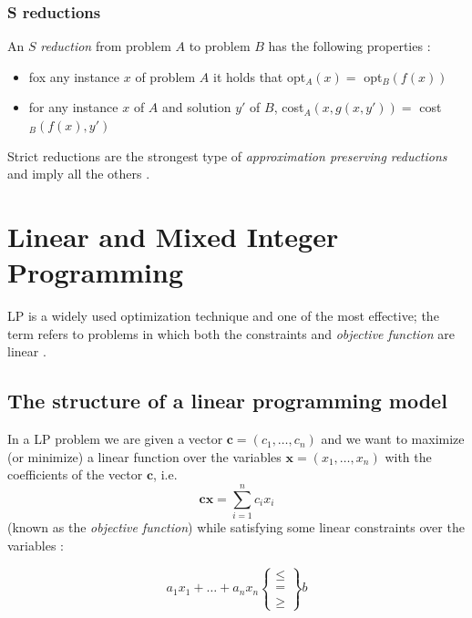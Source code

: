 \subsubsection{S reductions}%
\label{sub:strict_reductions}

An $S$ \emph{reduction} from problem $A$ to problem $B$ has the following properties \cite{Crescenzi1997ASG}:
\begin{itemize}
	\item fox any instance $x$ of problem $A$ it holds that opt$_{A} (x) = $ opt$_{B} (f(x))$
	\item for any instance $x$ of $A$ and solution $y'$ of $B$, cost$_{A} (x,
		      g(x, y')) = $ cost$_{B} (f(x), y')$
\end{itemize}

Strict reductions are the strongest type of \emph{approximation preserving
	reductions} and imply all the others \cite{Crescenzi1997ASG}.

\clearpage

\section{Linear and Mixed Integer Programming}%
\label{sec:linear_and_mixed_integer_programming}

\acrlong{LP} is a widely used optimization technique and one of the most
effective; the term refers to problems in which both the constraints and \emph{objective
	function} are linear
\cite{Edgar2001}\cite{Vanderbei2008}\cite{Dantzig1998}\cite{Martin1998}.

\subsection{The structure of a linear programming model}%
\label{sub:the_structure_of_a_linear_programming_model}

In a \acrfull{LP} problem we are given a vector $ \mathbf{c} = (c_1,
	\dots, c_n) $ and we want to maximize (or minimize) a linear function over
the variables $ \mathbf{x} = (x_1, \dots, x_n) $ with the coefficients of the
vector $ \mathbf{c} $, i.e.
\begin{equation*}
	\mathbf{cx} = \sum^{n}_{i=1} c_i x_i
\end{equation*}
(known as the \emph{objective function}) while satisfying some linear
constraints over the variables \cite{Bertsimas1997}\cite{Vanderbei2008}:

\begin{equation*}
	a_1 x_1 + \dots + a_n x_n \begin{Bmatrix} \leq \\ = \\ \geq \end{Bmatrix} b
\end{equation*}

